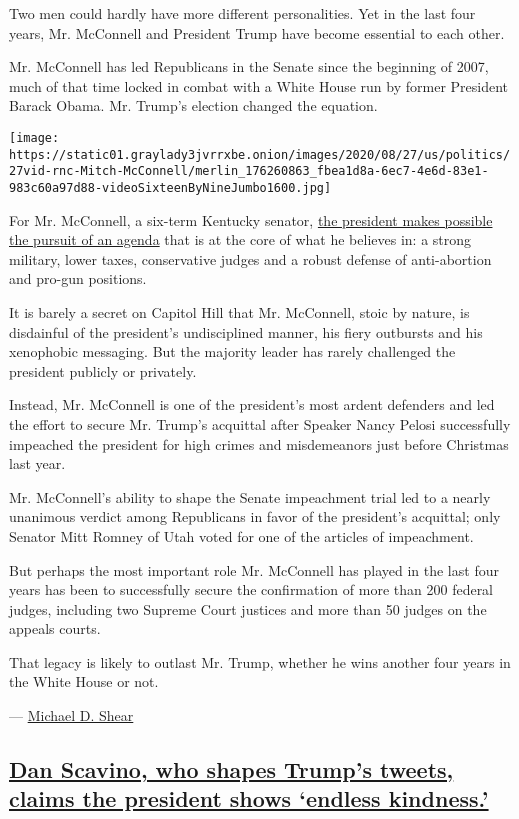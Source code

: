 Two men could hardly have more different personalities. Yet in the last
four years, Mr. McConnell and President Trump have become essential to
each other.

Mr. McConnell has led Republicans in the Senate since the beginning of
2007, much of that time locked in combat with a White House run by
former President Barack Obama. Mr. Trump's election changed the
equation.

\texttt{[image: https://static01.graylady3jvrrxbe.onion/images/2020/08/27/us/politics/27vid-rnc-Mitch-McConnell/merlin\_176260863\_fbea1d8a-6ec7-4e6d-83e1-983c60a97d88-videoSixteenByNineJumbo1600.jpg]}

For Mr. McConnell, a six-term Kentucky senator,
\href{https://www.nytimes3xbfgragh.onion/2019/01/22/magazine/mcconnell-senate-trump.html}{the
president makes possible the pursuit of an agenda} that is at the core
of what he believes in: a strong military, lower taxes, conservative
judges and a robust defense of anti-abortion and pro-gun positions.

It is barely a secret on Capitol Hill that Mr. McConnell, stoic by
nature, is disdainful of the president's undisciplined manner, his fiery
outbursts and his xenophobic messaging. But the majority leader has
rarely challenged the president publicly or privately.

Instead, Mr. McConnell is one of the president's most ardent defenders
and led the effort to secure Mr. Trump's acquittal after Speaker Nancy
Pelosi successfully impeached the president for high crimes and
misdemeanors just before Christmas last year.

Mr. McConnell's ability to shape the Senate impeachment trial led to a
nearly unanimous verdict among Republicans in favor of the president's
acquittal; only Senator Mitt Romney of Utah voted for one of the
articles of impeachment.

But perhaps the most important role Mr. McConnell has played in the last
four years has been to successfully secure the confirmation of more than
200 federal judges, including two Supreme Court justices and more than
50 judges on the appeals courts.

That legacy is likely to outlast Mr. Trump, whether he wins another four
years in the White House or not.

--- \href{https://www.nytimes3xbfgragh.onion/by/michael-d-shear}{Michael
D. Shear}

\hypertarget{dan-scavino-who-shapes-trumps-tweets-claims-the-president-shows-endless-kindness}{%
\subsection{\texorpdfstring{\protect\hyperlink{dan-scavino-who-shapes-trumps-tweets-claims-the-president-shows-endless-kindness}{Dan
Scavino, who shapes Trump's tweets, claims the president shows `endless
kindness.'}}{Dan Scavino, who shapes Trump's tweets, claims the president shows `endless kindness.'}}\label{dan-scavino-who-shapes-trumps-tweets-claims-the-president-shows-endless-kindness}}

